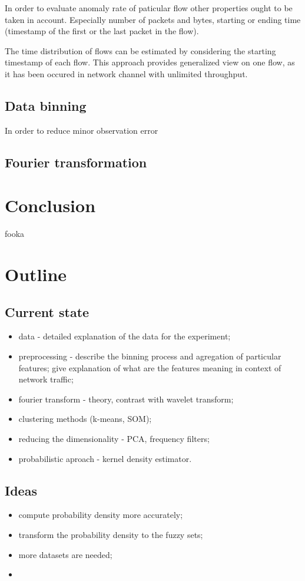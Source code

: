 \documentclass[a4paper]{IEEEtran}
\begin{document}
In order to evaluate anomaly rate of paticular flow other properties ought to be
taken in account. Especially number of packets and bytes, starting or ending time
(timestamp of the first or the last packet in the flow).

The time distribution of flows can be estimated by considering the
starting timestamp of each flow. This 
approach provides generalized view on one flow, as it has been occured 
in network channel with unlimited throughput.

\subsection{Data binning}
In order to reduce minor observation error 

\subsection{Fourier transformation}

\section{Conclusion}
fooka

\section{Outline}
\subsection{Current state}
\begin{itemize}
	\item data - detailed explanation of the data for the experiment;
	\item preprocessing - describe the binning process and agregation of particular features; give explanation of what are the features meaning in context of network traffic;
	\item fourier transform - theory, contrast with wavelet transform;
	\item clustering methods (k-means, SOM);
	\item reducing the dimensionality - PCA, frequency filters;
	\item probabilistic aproach - kernel density estimator.
\end{itemize}
\subsection{Ideas}
\begin{itemize}
	\item compute probability density more accurately;
	\item transform the probability density to the fuzzy sets;
	\item more datasets are needed;
	\item 
\end{itemize}
\end{document}
